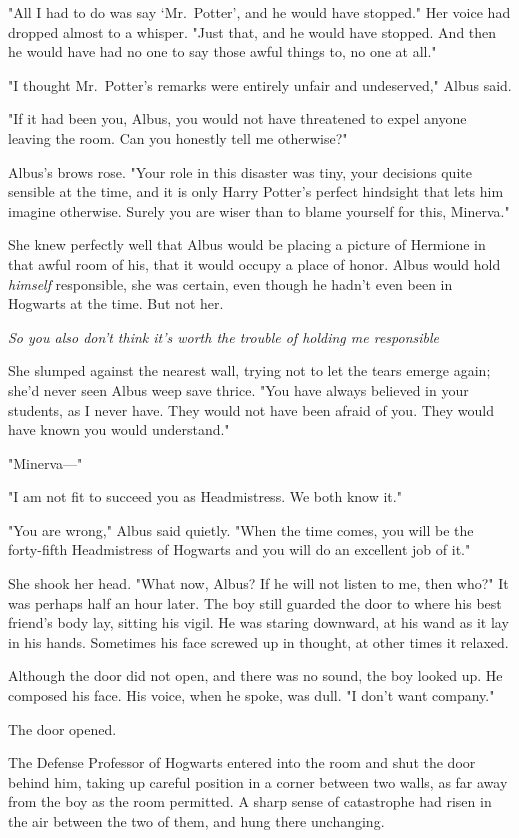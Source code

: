 "All I had to do was say `Mr.~Potter', and he would have stopped." Her voice
had dropped almost to a whisper. "Just that, and he would have stopped. And
then he would have had no one to say those awful things to, no one at all."

"I thought Mr.~Potter's remarks were entirely unfair and undeserved," Albus
said.

"If it had been you, Albus, you would not have threatened to expel anyone
leaving the room. Can you honestly tell me otherwise?"

Albus's brows rose. "Your role in this disaster was tiny, your decisions quite
sensible at the time, and it is only Harry Potter's perfect hindsight that lets
him imagine otherwise. Surely you are wiser than to blame yourself for this,
Minerva."

She knew perfectly well that Albus would be placing a picture of Hermione in
that awful room of his, that it would occupy a place of honor. Albus would hold
\emph{himself} responsible, she was certain, even though he hadn't even been in
Hogwarts at the time. But not her.

\emph{So you also don't think it's worth the trouble of holding me
responsible{\el}}

She slumped against the nearest wall, trying not to let the tears emerge again;
she'd never seen Albus weep save thrice. "You have always believed in your
students, as I never have. They would not have been afraid of you. They would
have known you would understand."

"Minerva\mbox{---}"

"I am not fit to succeed you as Headmistress. We both know it."

"You are wrong," Albus said quietly. "When the time comes, you will be the
forty-fifth Headmistress of Hogwarts and you will do an excellent job of it."

She shook her head. "What now, Albus? If he will not listen to me, then who?"
\sbreak
It was perhaps half an hour later. The boy still guarded the door to where his
best friend's body lay, sitting his vigil. He was staring downward, at his wand
as it lay in his hands. Sometimes his face screwed up in thought, at other
times it relaxed.

Although the door did not open, and there was no sound, the boy looked up. He
composed his face. His voice, when he spoke, was dull. "I don't want company."

The door opened.

The Defense Professor of Hogwarts entered into the room and shut the door
behind him, taking up careful position in a corner between two walls, as far
away from the boy as the room permitted. A sharp sense of catastrophe had risen
in the air between the two of them, and hung there unchanging.

